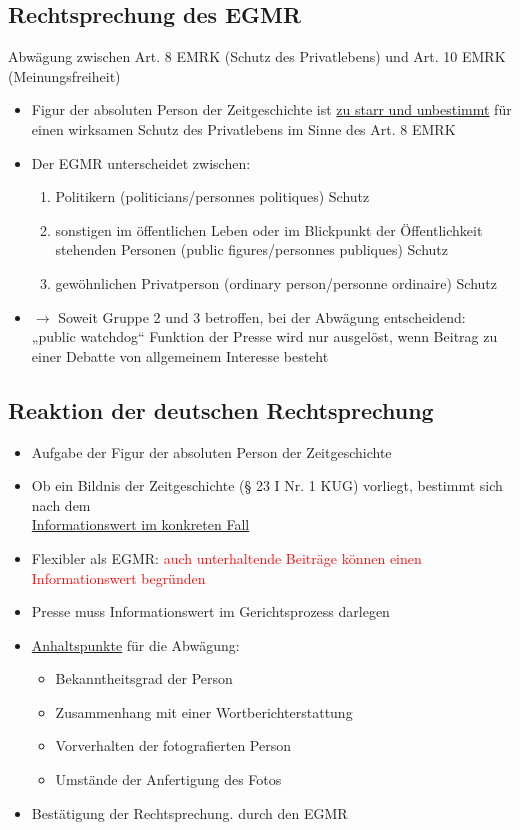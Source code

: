 \subsection{Rechtsprechung des EGMR}
Abwägung zwischen Art. 8 EMRK (Schutz des Privatlebens) und Art. 10 EMRK (Meinungsfreiheit)
\begin{itemize}
    \item Figur der absoluten Person der Zeitgeschichte ist \underline{zu starr und unbestimmt} für einen wirksamen Schutz des Privatlebens im Sinne des Art. 8 EMRK
    \item Der EGMR unterscheidet zwischen:
    \begin{enumerate}
        \item Politikern (politicians/personnes politiques) Schutz
        \item sonstigen im öffentlichen Leben oder im Blickpunkt der Öffentlichkeit stehenden Personen (public figures/personnes publiques) Schutz
        \item gewöhnlichen Privatperson (ordinary person/personne ordinaire) Schutz
    \end{enumerate}
    \item $\rightarrow$ Soweit Gruppe 2 und 3 betroffen, bei der Abwägung entscheidend:\\„public watchdog“ Funktion der Presse wird nur ausgelöst, wenn Beitrag zu einer Debatte von allgemeinem Interesse besteht
\end{itemize}
%
%
%
\subsection{Reaktion der deutschen Rechtsprechung}
\begin{itemize}
    \item Aufgabe der Figur der absoluten Person der Zeitgeschichte
    \item Ob ein Bildnis der Zeitgeschichte (§ 23 I Nr. 1 KUG) vorliegt, bestimmt sich nach dem \\ \underline{Informationswert im konkreten Fall}
    \item Flexibler als EGMR: \textcolor{red}{auch unterhaltende Beiträge können einen Informationswert begründen}
    \item Presse muss Informationswert im Gerichtsprozess darlegen
    \item \underline{Anhaltspunkte} für die Abwägung:
    \begin{itemize}
        \item Bekanntheitsgrad der Person
        \item Zusammenhang mit einer Wortberichterstattung
        \item Vorverhalten der fotografierten Person
        \item Umstände der Anfertigung des Fotos
    \end{itemize}
    \item Bestätigung der Rechtsprechung. durch den EGMR
\end{itemize}

